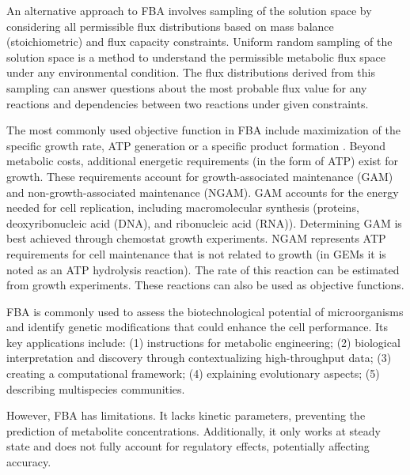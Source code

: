 
An alternative approach to FBA involves sampling of the solution space by considering all permissible flux distributions based on mass balance (stoichiometric) and flux capacity constraints. Uniform random sampling of the solution space is a method to understand the permissible metabolic flux space under any environmental condition. The flux distributions derived from this sampling can answer questions about the most probable flux value for any reactions and dependencies between two reactions under given constraints. \cite{Becker2007}

The most commonly used objective function in FBA include maximization of the specific growth rate, ATP generation or a specific product formation \cite{Kerkhoven2014}.
Beyond metabolic costs, additional energetic requirements (in the form of ATP) exist for growth. These requirements account for growth-associated maintenance (GAM) and non-growth-associated maintenance (NGAM). \cite{Feist2007}
GAM accounts for the energy needed for cell replication, including macromolecular synthesis (proteins, deoxyribonucleic acid (DNA), and ribonucleic acid (RNA)). Determining GAM is best achieved through chemostat growth experiments. NGAM represents ATP requirements for cell maintenance that is not related to growth (in GEMs it is noted as an ATP hydrolysis reaction). The rate of this reaction can be estimated from growth experiments. \cite{Thiele2010} These reactions can also be used as objective functions.

FBA is commonly used to assess the biotechnological potential of 
microorganisms and identify genetic modifications that could enhance the cell performance. Its key applications include:
(1) instructions for metabolic engineering;
(2) biological interpretation and discovery through 
contextualizing high-throughput data;
(3) creating a computational framework;
(4) explaining evolutionary aspects;
(5) describing multispecies communities. \cite{Kerkhoven2014}

However, FBA has limitations. It lacks kinetic parameters, preventing the prediction of metabolite concentrations. Additionally, it only works at steady state and does not fully account for regulatory effects, potentially affecting accuracy. \cite{Orth2010}



